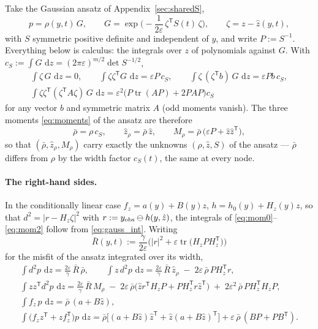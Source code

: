 \documentclass[11pt,a4paper]{article}
\newcommand{\dd}{\,\mathrm{d}}
\newcommand{\tr}{\operatorname{tr}}
\newcommand{\T}{^{\mathsf T}}
\newcommand{\zh}{\hat{z}}
\newcommand{\zr}{\hat{z}_{\rho}}   %
\newcommand{\Mr}{M_{\rho}}          %
\newcommand{\eps}{\varepsilon}
\newcommand{\abs}[1]{\left\lvert #1 \right\rvert}
\theoremstyle{plain}
\theoremstyle{definition}
\theoremstyle{remark}
\begin{document}
Take the Gaussian ansatz of Appendix~\ref{sec:sharedS},
\[
  p = \rho(y,t)\,G, \qquad G = \exp\Big(-\frac{1}{2\eps}\,\zeta\T S(t)\,\zeta\Big), \qquad \zeta = z-\zh(y,t),
\]
with $S$ symmetric positive definite and independent of $y$, and write $P := S^{-1}$. Everything below is calculus: the integrals over $z$ of polynomials against $G$. With $c_S := \int G\,\dd z = (2\pi\eps)^{m/2}\det S^{-1/2}$,
\begin{equation}
  \begin{gathered}
  \int \zeta\,G\,\dd z = 0, \qquad
  \int \zeta\zeta\T G\,\dd z = \eps P\,c_S, \qquad
  \int \zeta\,(\zeta\T b)\,G\,\dd z = \eps Pb\,c_S, \\
  \int \zeta\zeta\T(\zeta\T\!A\zeta)\,G\,\dd z = \eps^2\big(P\tr(AP) + 2PAP\big)c_S
  \end{gathered}
  \label{eq:gauss_int}
\end{equation}
for any vector $b$ and symmetric matrix $A$ (odd moments vanish). The three moments \eqref{eq:moments} of the ansatz are therefore
\begin{equation}
  \bar\rho = \rho\,c_S, \qquad \zr = \bar\rho\,\zh, \qquad \Mr = \bar\rho\,\big(\eps P + \zh\zh\T\big),
  \label{eq:moments_ansatz}
\end{equation}
so that $(\bar\rho,\zr,\Mr)$ carry exactly the unknowns $(\rho,\zh,S)$ of the ansatz --- $\bar\rho$ differs from $\rho$ by the width factor $c_S(t)$, the same at every node.

\paragraph{The right-hand sides.} In the conditionally linear case $f_z = a(y)+B(y)z$, $h = h_0(y)+H_z(y)z$, so that $d^2 = \abs{r - H_z\zeta}^2$ with $r := y_{\rm obs}\ominus h(y,\zh)$, the integrals of \eqref{eq:mom0}--\eqref{eq:mom2} follow from \eqref{eq:gauss_int}. Writing
\begin{equation}
  \bar R(y,t) := \frac{\gamma}{2\eps}\Big(\abs r^2 + \eps\tr\big(H_zPH_z\T\big)\Big)
  \label{eq:Rbar}
\end{equation}
for the misfit of the ansatz integrated over its width,
\begin{gather*}
  \int d^2 p\,\dd z = \tfrac{2\eps}{\gamma}\,\bar R\,\bar\rho, \qquad
  \int z\,d^2 p\,\dd z = \tfrac{2\eps}{\gamma}\,\bar R\,\zr \;-\; 2\eps\,\bar\rho\,PH_z\T r, \\
  \int zz\T d^2 p\,\dd z = \tfrac{2\eps}{\gamma}\,\bar R\,\Mr \;-\; 2\eps\,\bar\rho\big(\zh r\T H_zP + PH_z\T r\zh\T\big) \;+\; 2\eps^2\,\bar\rho\,PH_z\T H_zP, \\
  \int f_z\,p\,\dd z = \bar\rho\,(a+B\zh), \\
  \int\big(f_zz\T+zf_z\T\big)p\,\dd z = \bar\rho\Big[(a+B\zh)\zh\T + \zh(a+B\zh)\T\Big] + \eps\,\bar\rho\,(BP+PB\T).
\end{gather*}
\end{document}
